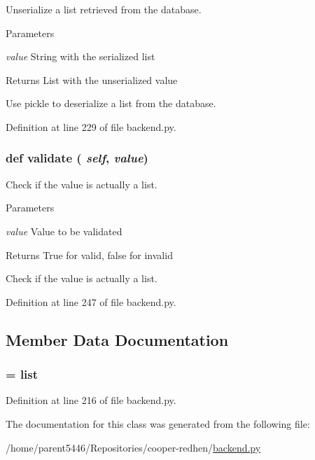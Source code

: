 Unserialize a list retrieved from the database. 
\begin{DoxyParams}{Parameters}
\item[{\em value}]String with the serialized list \end{DoxyParams}
\begin{DoxyReturn}{Returns}
List with the unserialized value\begin{DoxyVerb}Use pickle to deserialize a list from the database.\end{DoxyVerb}
 
\end{DoxyReturn}


Definition at line 229 of file backend.py.\hypertarget{classbackend_1_1_generic_list_property_a8f3dc5c8aaf85c281c2f52cda259aa56}{
\subsubsection[{validate}]{\setlength{\rightskip}{0pt plus 5cm}def validate ( {\em self}, \/   {\em value})}}
\label{classbackend_1_1_generic_list_property_a8f3dc5c8aaf85c281c2f52cda259aa56}


Check if the value is actually a list. 
\begin{DoxyParams}{Parameters}
\item[{\em value}]Value to be validated \end{DoxyParams}
\begin{DoxyReturn}{Returns}
True for valid, false for invalid\begin{DoxyVerb}Check if the value is actually a list.\end{DoxyVerb}
 
\end{DoxyReturn}


Definition at line 247 of file backend.py.

\subsection{Member Data Documentation}
\hypertarget{classbackend_1_1_generic_list_property_ac2ad7f431e3446fddcd9b6b9f93c4c14}{
\subsubsection[{data\_\-type}]{ = list}}
\label{classbackend_1_1_generic_list_property_ac2ad7f431e3446fddcd9b6b9f93c4c14}


Definition at line 216 of file backend.py.

The documentation for this class was generated from the following file:\begin{DoxyCompactItemize}
\item 
/home/parent5446/Repositories/cooper-\/redhen/\hyperlink{backend_8py}{backend.py}\end{DoxyCompactItemize}
